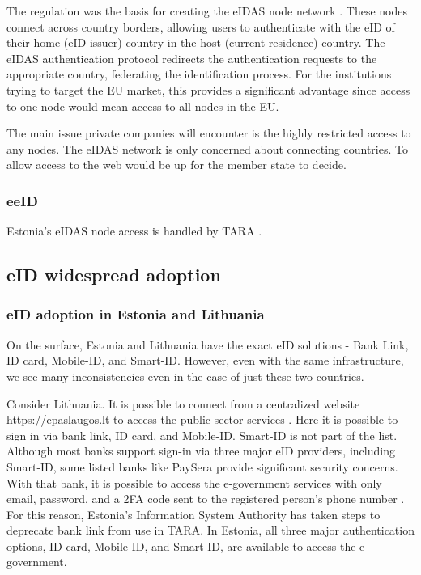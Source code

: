 The regulation was the basis for creating the eIDAS node network \cite{carretero2018federated}. These nodes connect across country borders, allowing users to authenticate with the eID of their home (eID issuer) country in the host (current residence) country. The eIDAS authentication protocol redirects the authentication requests to the appropriate country, federating the identification process. For the institutions trying to target the EU market, this provides a significant advantage since access to one node would mean access to all nodes in the EU.

The main issue private companies will encounter is the highly restricted access to any nodes. The eIDAS network is only concerned about connecting countries. To allow access to the web would be up for the member state to decide.

\subsubsection{eeID}

Estonia's eIDAS node access is handled by TARA \cite{tara}. 

\subsection{eID widespread adoption}

\subsubsection{eID adoption in Estonia and Lithuania}

On the surface, Estonia and Lithuania have the exact eID solutions - Bank Link, ID card, Mobile-ID, and Smart-ID. However, even with the same infrastructure, we see many inconsistencies even in the case of just these two countries.

Consider Lithuania. It is possible to connect from a centralized website \url{https://epaslaugos.lt} to access the public sector services \cite{eidasnode-lt}. Here it is possible to sign in via bank link, ID card, and Mobile-ID. Smart-ID is not part of the list. Although most banks support sign-in via three major eID providers, including Smart-ID, some listed banks like PaySera provide significant security concerns. With that bank, it is possible to access the e-government services with only email, password, and a 2FA code sent to the registered person's phone number . For this reason, Estonia's Information System Authority has taken steps to deprecate bank link \cite{ria-deprecates-bank-link} from use in TARA. In Estonia, all three major authentication options, ID card, Mobile-ID, and Smart-ID, are available to access the e-government.

